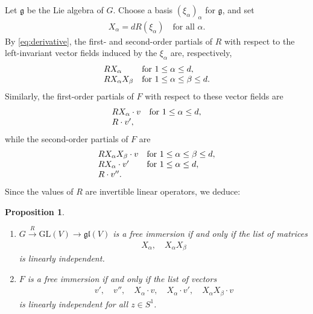 \documentclass[a4paper,10pt,leqno]{article}
\numberwithin{equation}{section}
\theoremstyle{plain}
\newtheorem{prop}[thm]{Proposition}
\theoremstyle{definition}
\theoremstyle{remark}
\newcommand{\fr}{\mathfrak}
\newcommand{\GL}{\mathrm{GL}}
\begin{document}
Let $\fr{g}$ be the Lie algebra of $G$.
Choose a basis $(\xi_\alpha)_\alpha$ for $\fr{g}$, and set
\begin{align}
X_\alpha = dR(\xi_\alpha)
\quad\text{for all $\alpha$}.
\end{align}
By \eqref{eq:derivative}, the first- and second-order partials of $R$ with respect to the left-invariant vector fields induced by the $\xi_\alpha$ are, respectively,
\begin{align}
\begin{array}{l@{\quad}l}
R X_\alpha
	&\text{for $1 \leq \alpha \leq d$},\\
R X_\alpha X_\beta
	&\text{for $1 \leq \alpha \leq \beta \leq d$}.
\end{array}
\end{align}
Similarly, the first-order partials of $F$ with respect to these vector fields are
\begin{align}
\begin{array}{l@{\quad}l}
R X_\alpha \cdot v
	&\text{for $1 \leq \alpha \leq d$},\\
R \cdot v',
\end{array}
\end{align}
while the second-order partials of $F$ are
\begin{align}
\begin{array}{l@{\quad}l}
R X_\alpha X_\beta \cdot v
	&\text{for $1 \leq \alpha \leq \beta \leq d$},\\
R X_\alpha \cdot v'
	&\text{for $1 \leq \alpha \leq d$},\\
R \cdot v''.
\end{array}
\end{align}
Since the values of $R$ are invertible linear operators, we deduce:

\begin{prop}\label{prop:partials}
\begin{enumerate} 
\item 	$G \xrightarrow{R} \GL(V) \to \fr{gl}(V)$ is a free immersion if and only if the list of matrices
\begin{align}\label{eq:list-r}
	X_\alpha,\quad
	X_\alpha X_\beta
\end{align} 
is linearly independent.

\item 	$F$ is a free immersion if and only if the list of vectors 
\begin{align}\label{eq:list-f}
v',\quad 
v'',\quad 
X_\alpha \cdot v,\quad
X_\alpha \cdot v',\quad 
X_\alpha X_\beta \cdot v
\end{align} 
is linearly independent for all $z \in S^1$.

\end{enumerate}
\end{prop} 
\end{document}
